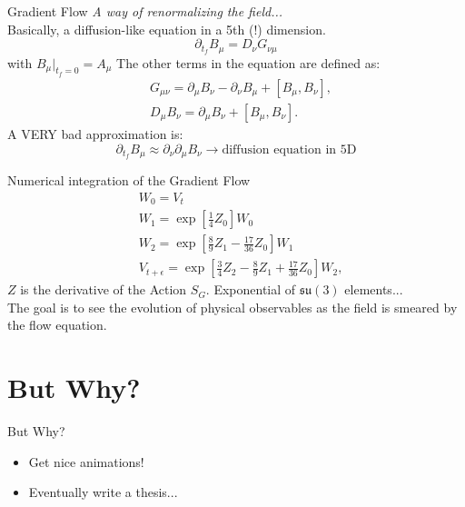 \documentclass[10pt]{beamer}
\begin{document}
\begin{frame}{Gradient Flow}
	\textit{A way of renormalizing the field...}\\
	Basically, a diffusion-like equation in a 5th (!) dimension.
	\begin{equation}\nonumber
		\partial_{t_f}{B}_\mu = D_\nu G_{\nu\mu}
	\end{equation}\nonumber
	with $B_{\mu}|_{t_f = 0} = A_\mu$
	The other terms in the equation are defined as:
	\begin{align}\nonumber
	    &G_{\mu\nu} = \partial_\mu B_\nu - \partial_\nu B_\mu + [B_\mu, B_\nu] , \\\nonumber
	    &D_{\mu}B_\nu = \partial_\mu B_\nu + [B_\mu, B_\nu ].
	\end{align}
	A VERY bad approximation is:
	\begin{equation}\nonumber
		\partial_{t_f}{B}_\mu \approx \partial_\nu \partial_\mu B_\nu \rightarrow \text{diffusion equation in 5D}
	\end{equation}
\end{frame}

\begin{frame}{Numerical integration of the Gradient Flow}
	\begin{align}\nonumber
		&W_0 = V_t\\\nonumber
		&W_1 = \exp\left[ \frac{1}{4}Z_0 \right] W_0 \\\nonumber
		&W_2 = \exp\left[ \frac{8}{9}Z_1 - \frac{17}{36}Z_0 \right] W_1\\\nonumber
		&V_{t+\epsilon} = \exp\left[ \frac{3}{4}Z_2 - \frac{8}{9}Z_1 + \frac{17}{36}Z_0\right] W_2,
	\end{align}
	$Z$ is the derivative of the Action $S_G$. Exponential of $\mathfrak{su}(3)$ elements...\\
	The goal is to see the evolution of physical observables as the field is smeared by the flow equation.
\end{frame}


\section{But Why?}
\begin{frame}{But Why?}
	\begin{itemize}
		\item Get nice animations!
		\item Eventually write a thesis...
	\end{itemize}
\end{frame}
\end{document}
